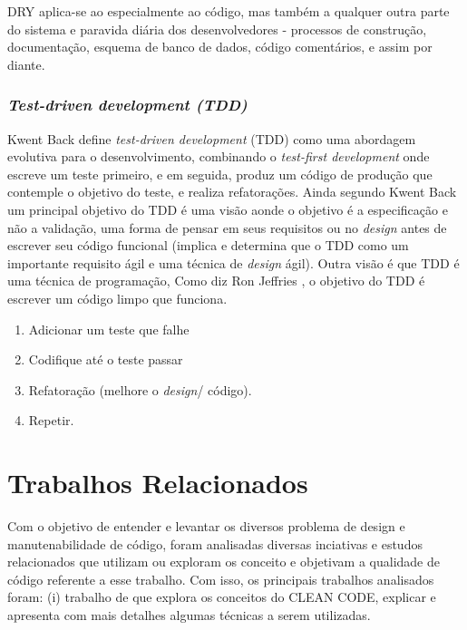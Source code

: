 \documentclass[12pt]{article}
\begin{document}
DRY aplica-se ao especialmente ao código, mas também a qualquer outra parte do sistema e paravida diária dos desenvolvedores - processos de construção, documentação, esquema de banco de dados, código comentários, e assim por diante.

\section{\textsl{Test-driven development (TDD)}} \label{sec:tdd}

Kwent Back \cite{TDD_EXAMPLE} define \textit{test-driven development} (TDD) como uma abordagem evolutiva para o desenvolvimento, combinando o \textit{test-first development } onde escreve um teste primeiro, e em seguida, produz um código de produção que contemple o objetivo do teste, e realiza refatorações. Ainda segundo Kwent Back um principal objetivo do TDD é uma visão aonde o objetivo é a especificação e não a validação, uma forma de pensar em seus requisitos ou no \textit{design} antes de escrever seu código funcional (implica e determina que o TDD como um importante requisito ágil e uma técnica de \textit{design} ágil). Outra visão é que TDD é uma técnica de programação, Como diz Ron Jeffries \cite{CLEAN_CODE_TOO_MUCH_OF_A_GOOD_THING}, o objetivo do TDD é escrever um código limpo que funciona.

\begin{enumerate}
\item Adicionar um teste que falhe
\item Codifique até o teste passar
\item Refatoração (melhore o \textit{design}/ código).
\item Repetir.
\end{enumerate}

	
\part{Trabalhos Relacionados} \label{sec:trabalhosrelacionados}

Com o objetivo de entender e levantar os diversos problema de design e manutenabilidade de código, foram analisadas diversas inciativas e estudos relacionados que utilizam ou exploram os conceito e objetivam a qualidade de código referente a esse trabalho.
Com isso, os principais trabalhos analisados foram: (i) trabalho de \cite{TR_CLEAN_CODE_INTRODUCAO} que explora os conceitos do CLEAN CODE, explicar e apresenta com mais detalhes algumas técnicas a serem utilizadas.
\end{document}
